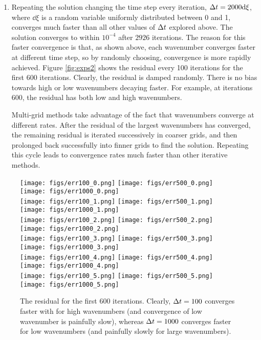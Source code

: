 \documentclass[11pt]{article}
\begin{document}
\begin{enumerate}
        \item  Repeating the solution changing the time step every iteration, $\Delta t=2000{\rm d} \xi$, where $\dd \xi$ is a random variable uniformly distributed between 0 and 1, converges much faster than all other values of $\Delta t$ explored above. The solution converges to within $10^{-4}$ after $2926$ iterations.   The reason for this faster convergence is that, as shown above, each wavenumber converges faster at different time step, so by randomly choosing, convergence is more rapidly achieved. Figure \ref{fig:exps2} shows the residual every 100 iterations for the first 600 iterations. Clearly, the residual is damped randomly. There is no bias towards high or low wavenumbers decaying faster. For example, at iterations 600, the residual has both low and high wavenumbers.

            Multi-grid methods take advantage of the fact that wavenumbers converge  at different rates. After the residual of the largest wavenumbers has converged, the remaining residual is iterated successively in coarser grids, and then prolonged back successfully into finner grids to find the solution. Repeating this cycle leads to convergence rates much faster than other iterative methods. 

    \end{enumerate}

    \begin{figure}[ht]
    \begin{center}
    \texttt{[image: figs/err100\_0.png]}  
    \texttt{[image: figs/err500\_0.png]}  
    \texttt{[image: figs/err1000\_0.png]}  \\ 
        \texttt{[image: figs/err100\_1.png]}  
    \texttt{[image: figs/err500\_1.png]}  
    \texttt{[image: figs/err1000\_1.png]}  \\
        \texttt{[image: figs/err100\_2.png]}  
    \texttt{[image: figs/err500\_2.png]}  
    \texttt{[image: figs/err1000\_2.png]}  \\
        \texttt{[image: figs/err100\_3.png]}  
    \texttt{[image: figs/err500\_3.png]}  
    \texttt{[image: figs/err1000\_3.png]}  \\
        \texttt{[image: figs/err100\_4.png]}  
    \texttt{[image: figs/err500\_4.png]}  
    \texttt{[image: figs/err1000\_4.png]}  \\
        \texttt{[image: figs/err100\_5.png]}  
    \texttt{[image: figs/err500\_5.png]}  
    \texttt{[image: figs/err1000\_5.png]}  \\ 
    \end{center}
    \caption{The residual for the first 600 iterations. Clearly, 
        $\Delta t=100$ converges faster with for high wavenumbers (and convergence of low wavenumber is painfully slow), whereas $\Delta t=1000$ converges faster for low wavenumbers (and painfully slowly for large wavenumbers).}
    \label{fig:exps}
    \end{figure}
\end{document}
